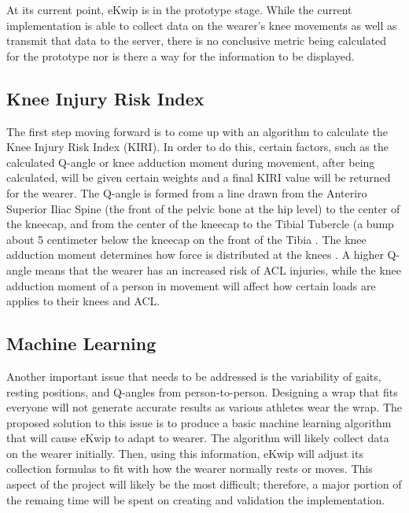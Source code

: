 At its current point, eKwip is in the prototype stage. While the current implementation is able to collect data on the wearer's knee movements as well as transmit that data to the server, there is no conclusive metric being calculated for the prototype nor is there a way for the information to be displayed. 

\subsection {Knee Injury Risk Index}
The first step moving forward is to come up with an algorithm to calculate the Knee Injury Risk Index (KIRI). In order to do this, certain factors, such as the calculated Q-angle or knee adduction moment during movement, after being calculated, will be given certain weights and a final KIRI value will be returned for the wearer. The Q-angle is formed from a line drawn from the Anteriro Superior Iliac Spine (the front of the pelvic bone at the hip level) to the center of the kneecap, and from the center of the kneecap to the Tibial Tubercle (a bump about 5 centimeter below the kneecap on the front of the Tibia \cite{conley2007female}. The knee adduction moment determines how force is distributed at the knees \cite{noyes2010knee}. A higher Q-angle means that the wearer has an increased risk of ACL injuries, while the knee adduction moment of a person in movement will affect how certain loads are applies to their knees and ACL. 

\subsection {Machine Learning}
Another important issue that needs to be addressed is the variability of gaits, resting positions, and Q-angles from person-to-person. Designing a wrap that fits everyone will not generate accurate results as various athletes wear the wrap. The proposed solution to this issue is to produce a basic machine learning algorithm that will cause eKwip to adapt to wearer. The algorithm will likely collect data on the wearer initially. Then, using this information, eKwip will adjust its collection formulas to fit with how the wearer normally rests or moves. This aspect of the project will likely be the most difficult; therefore, a major portion of the remaing time will be spent on creating and validation the implementation.

